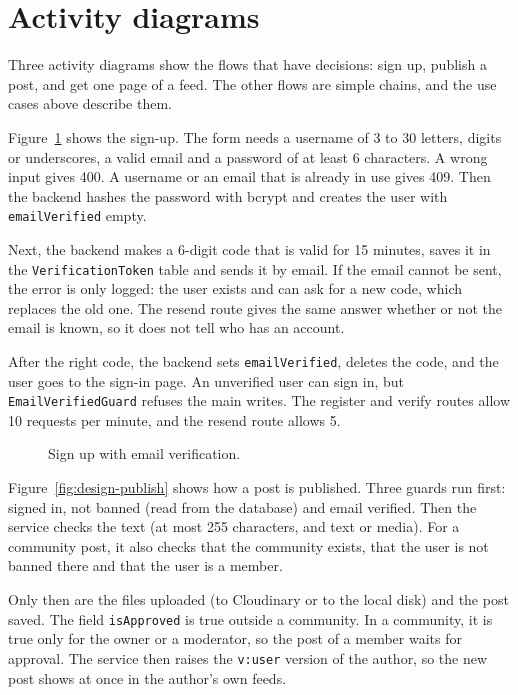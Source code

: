\section{Activity diagrams}
\label{sec:design-activity}

Three activity diagrams show the flows that have decisions: sign up, publish a post, and get one page of a feed. The other flows are simple chains, and the use cases above describe them.

Figure~\ref{fig:design-signup} shows the sign-up. The form needs a username of 3 to 30 letters, digits or underscores, a valid email and a password of at least 6 characters. A wrong input gives 400. A username or an email that is already in use gives 409. Then the backend hashes the password with bcrypt and creates the user with \texttt{emailVerified} empty.

Next, the backend makes a 6-digit code that is valid for 15 minutes, saves it in the \texttt{VerificationToken} table and sends it by email. If the email cannot be sent, the error is only logged: the user exists and can ask for a new code, which replaces the old one. The resend route gives the same answer whether or not the email is known, so it does not tell who has an account.

After the right code, the backend sets \texttt{emailVerified}, deletes the code, and the user goes to the sign-in page. An unverified user can sign in, but \texttt{EmailVerifiedGuard} refuses the main writes. The register and verify routes allow 10 requests per minute, and the resend route allows 5.

\begin{figure}[htbp]
  \centering
  \caption{Sign up with email verification.}
  \label{fig:design-signup}
\end{figure}

Figure~\ref{fig:design-publish} shows how a post is published. Three guards run first: signed in, not banned (read from the database) and email verified. Then the service checks the text (at most 255 characters, and text or media). For a community post, it also checks that the community exists, that the user is not banned there and that the user is a member.

Only then are the files uploaded (to Cloudinary or to the local disk) and the post saved. The field \texttt{isApproved} is true outside a community. In a community, it is true only for the owner or a moderator, so the post of a member waits for approval. The service then raises the \texttt{v:user} version of the author, so the new post shows at once in the author's own feeds.

